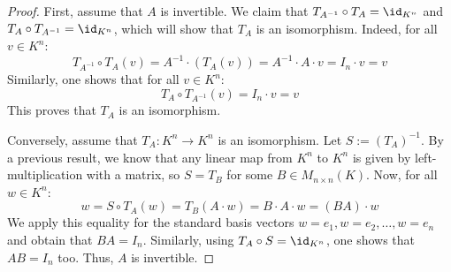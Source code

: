 \begin{proof}
First, assume that $A$ is invertible. We claim that $T_{A^{-1}} \circ T_A = \id_{K^n}$ and $T_A \circ T_{A^{-1}} = \id_{K^n}$, which will show that $T_A$ is an isomorphism. Indeed, for all $v \in K^n$:
\begin{equation*}
    T_{A^{-1}} \circ T_A(v) = A^{-1} \cdot (T_A(v)) = A^{-1} \cdot A \cdot v = I_n \cdot v = v
\end{equation*}
Similarly, one shows that for all $v \in K^n$:
\begin{equation*}
    T_A \circ T_{A^{-1}}(v) = I_n \cdot v = v
\end{equation*}
This proves that $T_A$ is an isomorphism.

Conversely, assume that $T_A: K^n \to K^n$ is an isomorphism. Let $S := (T_A)^{-1}$. By a previous result, we know that any linear map from $K^n$ to $K^n$ is given by left-multiplication with a matrix, so $S = T_B$ for some $B \in M_{n \times n}(K)$. Now, for all $w \in K^n$:
\begin{equation*}
    w = S \circ T_A(w) = T_B(A \cdot w) = B \cdot A \cdot w = (BA) \cdot w
\end{equation*}
We apply this equality for the standard basis vectors $w = e_1, w = e_2, \dots, w = e_n$ and obtain that $BA = I_n$. Similarly, using $T_A \circ S = \id_{K^n}$, one shows that $AB = I_n$ too. Thus, $A$ is invertible.
\end{proof}

